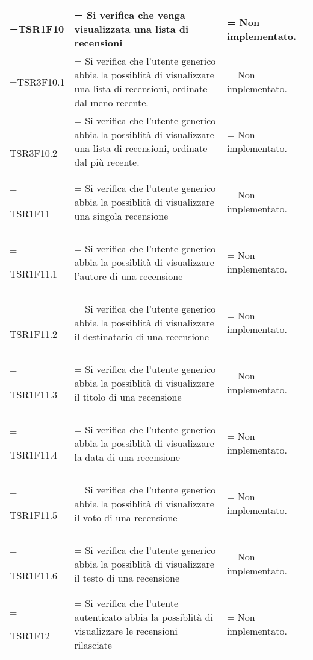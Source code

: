 \begin{xltabular}{\textwidth} {
        >{\hsize\linewidth=\hsize}X
        >{\hsize\linewidth=\hsize}X
        >{\hsize\linewidth=\hsize}X
    }
    TSR1F10&
    Si verifica che venga visualizzata una lista di recensioni &
    Non implementato.
    \\ \hline
    

    TSR3F10.1 &
    Si verifica che l'utente generico abbia la possiblità di visualizzare una lista di recensioni,
    ordinate dal meno recente.  &
    Non implementato.
    \\ \hline

    TSR3F10.2 &
    Si verifica che l'utente generico abbia la possiblità di visualizzare una lista di recensioni,
    ordinate dal più recente.  &
    Non implementato.
    \\ \hline

    TSR1F11 &
    Si verifica che l'utente generico abbia la possiblità di visualizzare una singola recensione  &
    Non implementato.
    \\ \hline
    
    TSR1F11.1 &
    Si verifica che l'utente generico abbia la possiblità di visualizzare l'autore di una recensione  &
    Non implementato.
    \\ \hline
    
    TSR1F11.2 &
    Si verifica che l'utente generico abbia la possiblità di visualizzare il destinatario di una recensione  &
    Non implementato.
    \\ \hline

    TSR1F11.3 &
    Si verifica che l'utente generico abbia la possiblità di visualizzare il titolo di una recensione  &
    Non implementato.
    \\ \hline

    TSR1F11.4 &
    Si verifica che l'utente generico abbia la possiblità di visualizzare la data di una recensione  &
    Non implementato.
    \\ \hline

    TSR1F11.5 &
    Si verifica che l'utente generico abbia la possiblità di visualizzare il voto di una recensione  &
    Non implementato.
    \\ \hline

    TSR1F11.6 &
    Si verifica che l'utente generico abbia la possiblità di visualizzare il testo di una recensione  &
    Non implementato.
    \\ \hline

    TSR1F12 &
    Si verifica che l'utente autenticato abbia la possiblità di visualizzare le recensioni rilasciate  &
    Non implementato.
    \\ \hline


\end{xltabular}
